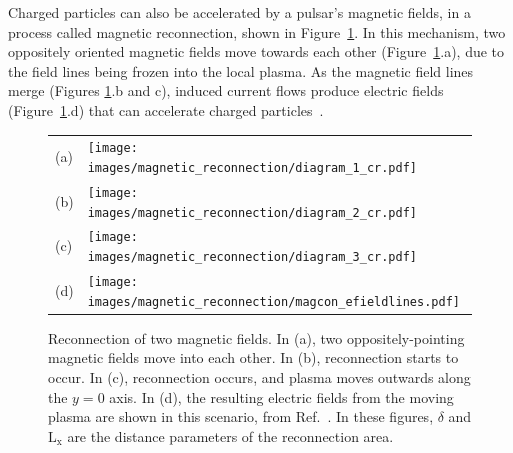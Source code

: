   Charged particles can also be accelerated by a pulsar's magnetic fields, in a process called magnetic reconnection, shown in Figure~\ref{fig:magcon}.
  In this mechanism, two oppositely oriented magnetic fields move towards each other (Figure~\ref{fig:magcon}.a), due to the field lines being frozen into the local plasma.
  As the magnetic field lines merge (Figures \ref{fig:magcon}.b and c), induced current flows produce electric fields (Figure~\ref{fig:magcon}.d) that can accelerate charged particles~\cite{magcon_crab,magcon_schopper,magcon_review,gamma_pwn1,gamma_pwn2,magconsim2011,magconsim2014,magcon_particleaccel}.
  
  \begin{figure}[!t]
    \centering
    \begin{tabular}{m{1cm}m{10cm}}
      (a) & \texttt{[image: images/magnetic\_reconnection/diagram\_1\_cr.pdf]} \\
      (b) & \texttt{[image: images/magnetic\_reconnection/diagram\_2\_cr.pdf]} \\
      (c) & \texttt{[image: images/magnetic\_reconnection/diagram\_3\_cr.pdf]} \\
      (d) & \texttt{[image: images/magnetic\_reconnection/magcon\_efieldlines.pdf]}
    \end{tabular}
    \caption[Magnetic Reconnection]{
      Reconnection of two magnetic fields.
      In (a), two oppositely-pointing magnetic fields move into each other.
      In (b), reconnection starts to occur.
      In (c), reconnection occurs, and plasma moves outwards along the $y=0$ axis.
      In (d), the resulting electric fields from the moving plasma are shown in this scenario, from Ref.~\cite{magcon_crab}.
      In these figures, $\delta$ and $\textrm{L}_{\textrm{x}}$ are the distance parameters of the reconnection area.
    }
    \label{fig:magcon}
  \end{figure}
  
  
  \FloatBarrier
  
  
  
  
